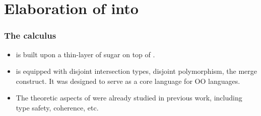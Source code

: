 \documentclass{beamer}
\begin{document}
\section{Elaboration of \name into \bname}

\begin{frame}
  \frametitle{The \bname calculus}

  \begin{itemize}
  \item \name is built upon a thin-layer of sugar on top of \bname.
  \item \bname is equipped with disjoint intersection types, disjoint
    polymorphism, the merge construct. It was designed to serve as a core
    language for OO languages.
  \item The theoretic aspects of \bname were already studied in previous work,
    including type safety, coherence, etc.

  \end{itemize}

\pause


\end{frame}
\end{document}

